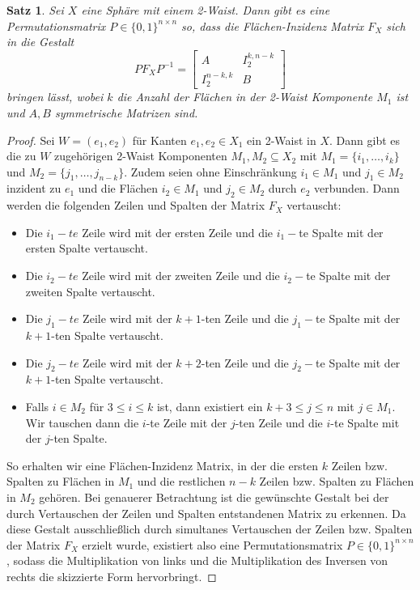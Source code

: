 \documentclass[12pt,titlepage,twoside,cleardoublepage]{article}
\theoremstyle{nummermitklammern}
\newtheorem{satz}[temp]{Satz}
\newtheorem{satz}[zahl]{Satz}
\numberwithin{equation}{section}
\begin{document}
\begin{satz}\label{mat2w}
Sei $X$ eine Sphäre mit einem 2-Waist. Dann gibt es eine Permutationsmatrix $P\in \{0,1\}^{n\times n}$ so, dass die Flächen-Inzidenz Matrix $F_X$ sich in die Gestalt 
\[
PF_XP^{-1}=
\left[ 
\begin{array}{c|c} 
  A & I^{k,n-k}_2 \\ 
  \hline 
  I^{n-k,k}_2 & B 
\end{array} 
\right]
\] 
bringen lässt, wobei $k$ die Anzahl der Flächen in der 2-Waist Komponente $M_1$ ist und $A,B$ symmetrische Matrizen sind.
\end{satz}
\begin{proof}
Sei $W=(e_1,e_2)$ für Kanten $e_1,e_2\in X_1$ ein 2-Waist in $X.$ Dann gibt es die zu $W$ zugehörigen 2-Waist Komponenten $M_1,M_2\subseteq X_2$ mit $M_1=\{i_1,\ldots,i_k\}$ und $M_2=\{j_1,\ldots,j_{n-k}\}$. Zudem seien ohne Einschränkung $i_1\in M_1$ und $j_1\in M_2$ inzident zu $e_1$ und die Flächen $i_2\in M_1$ und $j_2\in M_2$ durch $e_2$ verbunden. Dann werden die folgenden Zeilen und Spalten der Matrix $F_X$ vertauscht:
\begin{itemize}
\item Die $i_1-te$ Zeile wird mit der ersten Zeile und die  $i_1-$te Spalte mit der ersten Spalte vertauscht.
\item Die $i_2-te$ Zeile wird mit der zweiten Zeile und die $i_2-$te Spalte mit der zweiten Spalte vertauscht.
\item Die $j_1-te$ Zeile wird mit der $k+1$-ten Zeile und die $j_1-$te Spalte mit der $k+1$-ten Spalte vertauscht.
\item Die $j_2-te$ Zeile wird mit der $k+2$-ten Zeile und die $j_2-$te Spalte mit der $k+1$-ten Spalte vertauscht.
\item Falls $i\in M_2$ für $3\leq i \leq k$ ist, dann existiert ein $k+3\leq j\leq n$ mit $j \in M_1.$ 
Wir tauschen dann die $i$-te Zeile mit der $j$-ten Zeile und die $i$-te Spalte mit der $j$-ten Spalte.
\end{itemize} 
So erhalten wir eine Flächen-Inzidenz Matrix, in der die ersten $k$ Zeilen bzw. Spalten zu Flächen in $M_1$ und die restlichen $n-k$ Zeilen bzw. Spalten zu Flächen in $M_2$  gehören. Bei genauerer Betrachtung ist die gewünschte Gestalt  bei der durch Vertauschen der Zeilen und Spalten entstandenen Matrix zu erkennen. Da diese Gestalt ausschließlich durch simultanes Vertauschen der Zeilen bzw. Spalten der Matrix $F_X$ erzielt wurde, existiert also eine Permutationsmatrix $P\in\{0,1\}^{n\times n}$, sodass die Multiplikation von links und die Multiplikation des Inversen von rechts  die skizzierte Form hervorbringt.
\end{proof}
\end{document}
